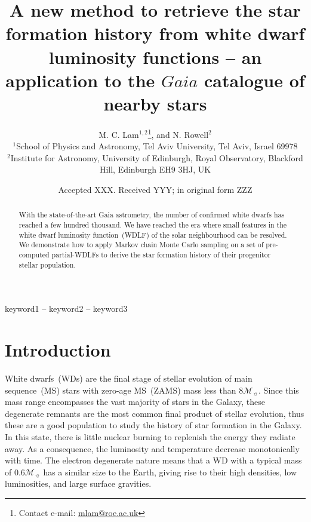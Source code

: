 \documentclass[fleqn,usenatbib]{mnras}
\title[Galactic SFH from Gaia GCNS WDLF]{A new method to retrieve the star formation history from white dwarf luminosity functions -- an application to the $Gaia$ catalogue of nearby stars}
\author[M. C. Lam et al.]{
M. C. Lam$^{1, 2}$\thanks{Contact e-mail: \href{mailto:mlam@roe.ac.uk}{mlam@roe.ac.uk}},
and N. Rowell$^{2}$
\\
$^{1}$School of Physics and Astronomy, Tel Aviv University, Tel Aviv, Israel 69978\\
$^{2}$Institute for Astronomy, University of Edinburgh, Royal Observatory, Blackford Hill, Edinburgh EH9 3HJ, UK
}
\date{Accepted XXX. Received YYY; in original form ZZZ}
\newcommand{\msun}{\mathcal{M}_{\sun}}
\begin{document}
\label{firstpage}
\pagerange{\pageref{firstpage}--\pageref{lastpage}}
\maketitle


\begin{abstract}
With the state-of-the-art Gaia astrometry, the number of confirmed white dwarfs
has reached a few hundred thousand. We have reached the era where small features
in the white dwarf luminosity function~(WDLF) of the solar neighbourhood can be
resolved. We demonstrate how to apply Markov chain Monte Carlo sampling on a
set of pre-computed partial-WDLFs to derive the star formation history of their
progenitor stellar population.

\end{abstract}

\begin{keywords}
keyword1 -- keyword2 -- keyword3
\end{keywords}



\section{Introduction}
White dwarfs~(WDs) are the final stage of stellar evolution of main
sequence~(MS) stars with zero-age MS~(ZAMS) mass less than $8\msun$. Since this
mass range encompasses the vast majority of stars in the Galaxy, these
degenerate remnants are the most common final product of stellar evolution,
thus these are a good population to study the history of star formation in the
Galaxy. In this state, there is little nuclear burning to replenish the energy
they radiate away. As a consequence, the luminosity and temperature decrease
monotonically with time. The electron degenerate nature means that a WD with a
typical mass of $0.6\mathcal{M}_{\sun}$ has a similar size to the Earth, giving
rise to their high densities, low luminosities, and large surface gravities.
\end{document}
